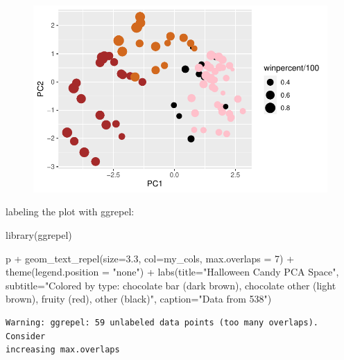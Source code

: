 \documentclass[
  letterpaper,
  DIV=11,
  numbers=noendperiod]{scrartcl}
\newenvironment{Shaded}{\begin{snugshade}}{\end{snugshade}}
\newcommand{\AttributeTok}[1]{\textcolor[rgb]{0.40,0.45,0.13}{#1}}
\newcommand{\DecValTok}[1]{\textcolor[rgb]{0.68,0.00,0.00}{#1}}
\newcommand{\FloatTok}[1]{\textcolor[rgb]{0.68,0.00,0.00}{#1}}
\newcommand{\FunctionTok}[1]{\textcolor[rgb]{0.28,0.35,0.67}{#1}}
\newcommand{\NormalTok}[1]{\textcolor[rgb]{0.00,0.23,0.31}{#1}}
\newcommand{\SpecialCharTok}[1]{\textcolor[rgb]{0.37,0.37,0.37}{#1}}
\newcommand{\StringTok}[1]{\textcolor[rgb]{0.13,0.47,0.30}{#1}}
\begin{document}
\begin{figure}[H]

{\centering \includegraphics{class10_project_files/figure-pdf/unnamed-chunk-22-1.pdf}

}

\end{figure}

labeling the plot with ggrepel:

\begin{Shaded}
\begin{Highlighting}[]
\FunctionTok{library}\NormalTok{(ggrepel)}

\NormalTok{p }\SpecialCharTok{+} \FunctionTok{geom\_text\_repel}\NormalTok{(}\AttributeTok{size=}\FloatTok{3.3}\NormalTok{, }\AttributeTok{col=}\NormalTok{my\_cols, }\AttributeTok{max.overlaps =} \DecValTok{7}\NormalTok{)  }\SpecialCharTok{+} 
  \FunctionTok{theme}\NormalTok{(}\AttributeTok{legend.position =} \StringTok{"none"}\NormalTok{) }\SpecialCharTok{+}
  \FunctionTok{labs}\NormalTok{(}\AttributeTok{title=}\StringTok{"Halloween Candy PCA Space"}\NormalTok{,}
       \AttributeTok{subtitle=}\StringTok{"Colored by type: chocolate bar (dark brown), chocolate other (light brown), fruity (red), other (black)"}\NormalTok{,}
       \AttributeTok{caption=}\StringTok{"Data from 538"}\NormalTok{)}
\end{Highlighting}
\end{Shaded}

\begin{verbatim}
Warning: ggrepel: 59 unlabeled data points (too many overlaps). Consider
increasing max.overlaps
\end{verbatim}
\end{document}
